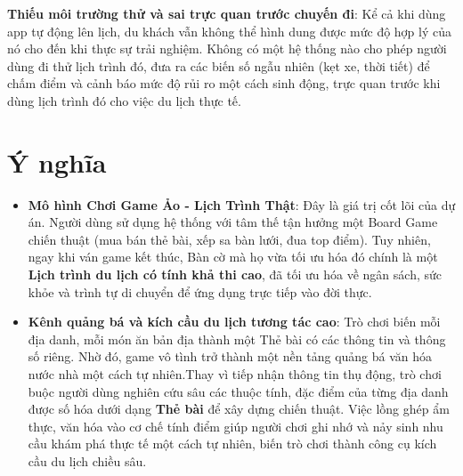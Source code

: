 \textbf{Thiếu môi trường thử và sai trực quan trước chuyến đi}: Kể cả khi dùng app tự động lên lịch, du khách vẫn không thể hình dung được mức độ hợp lý của nó cho đến khi thực sự trải nghiệm. Không có một hệ thống nào cho phép người dùng đi thử lịch trình đó, đưa ra các biến số ngẫu nhiên (kẹt xe, thời tiết) để chấm điểm và cảnh báo mức độ rủi ro một cách sinh động, trực quan trước khi dùng lịch trình đó cho việc du lịch thực tế.

\section{Ý nghĩa}

\begin{itemize}[topsep=0pt, itemsep=2.5pt, leftmargin=1.5cm]
    \item \textbf{Mô hình Chơi Game Ảo - Lịch Trình Thật}: Đây là giá trị cốt lõi của dự án. Người dùng sử dụng hệ thống với tâm thế tận hưởng một Board Game chiến thuật (mua bán thẻ bài, xếp sa bàn lưới, đua top điểm). Tuy nhiên, ngay khi ván game kết thúc, Bàn cờ mà họ vừa tối ưu hóa đó chính là một \textbf{Lịch trình du lịch có tính khả thi cao}, đã tối ưu hóa về ngân sách, sức khỏe và trình tự di chuyển để ứng dụng trực tiếp vào đời thực.

    \item \textbf{Kênh quảng bá và kích cầu du lịch tương tác cao}: Trò chơi biến mỗi địa danh, mỗi món ăn bản địa thành một Thẻ bài có các thông tin và thông số riêng. Nhờ đó, game vô tình trở thành một nền tảng quảng bá văn hóa nước nhà một cách tự nhiên.Thay vì tiếp nhận thông tin thụ động, trò chơi buộc người dùng nghiên cứu sâu các thuộc tính, đặc điểm của từng địa danh được số hóa dưới dạng \textbf{Thẻ bài} để xây dựng chiến thuật. Việc lồng ghép ẩm thực, văn hóa vào cơ chế tính điểm giúp người chơi ghi nhớ và nảy sinh nhu cầu khám phá thực tế một cách tự nhiên, biến trò chơi thành công cụ kích cầu du lịch chiều sâu.
\end{itemize}